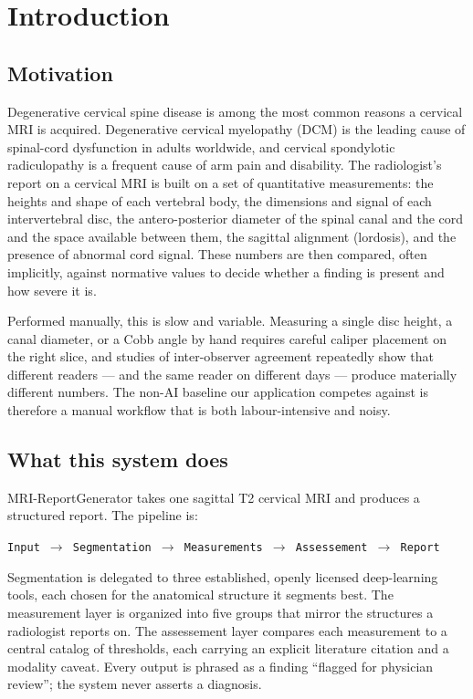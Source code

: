 \section{Introduction}
\label{sec:intro}

\subsection{Motivation}
Degenerative cervical spine disease is among the most common reasons a cervical MRI is acquired.
Degenerative cervical myelopathy (DCM) is the leading cause of spinal-cord dysfunction in adults
worldwide, and cervical spondylotic radiculopathy is a frequent cause of arm pain and disability. The
radiologist's report on a cervical MRI is built on a set of quantitative measurements: the heights and
shape of each vertebral body, the dimensions and signal of each intervertebral disc, the antero-posterior
diameter of the spinal canal and the cord and the space available between them, the sagittal alignment
(lordosis), and the presence of abnormal cord signal. These numbers are then compared, often
implicitly, against normative values to decide whether a finding is present and how severe it is.

Performed manually, this is slow and variable. Measuring a single disc height, a canal diameter, or a
Cobb angle by hand requires careful caliper placement on the right slice, and studies of inter-observer
agreement repeatedly show that different readers --- and the same reader on different days --- produce
materially different numbers. The non-AI baseline our application competes against is therefore a
manual workflow that is both labour-intensive and noisy.

\subsection{What this system does}
MRI-ReportGenerator takes one sagittal T2 cervical MRI and produces a structured report. The pipeline is:
\begin{center}
\texttt{Input $\rightarrow$ Segmentation $\rightarrow$ Measurements $\rightarrow$ Assessement $\rightarrow$ Report}
\end{center}
Segmentation is delegated to three established, openly licensed deep-learning tools, each chosen for the
anatomical structure it segments best. The measurement layer is organized into five groups that mirror
the structures a radiologist reports on. The assessement layer compares each measurement to a central
catalog of thresholds, each carrying an explicit literature citation and a modality caveat. Every output
is phrased as a finding ``flagged for physician review''; the system never asserts a diagnosis.

